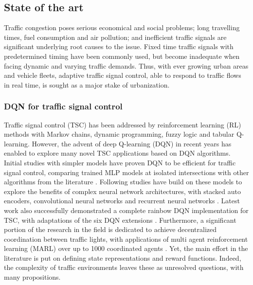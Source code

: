 \documentclass[journal]{IEEEtran}
\begin{document}
\subsection{State of the art}

Traffic congestion poses serious economical and social problems; long travelling times, fuel consumption and air pollution; and inefficient traffic signals are significant underlying root causes to the issue. Fixed time traffic signals with predetermined timing have been commonly used, but become inadequate when facing dynamic and varying traffic demands. Thus, with ever growing urban areas and vehicle fleets, adaptive traffic signal control, able to respond to traffic flows in real time, is sought as a major stake of urbanization. \\

\subsubsection{DQN for traffic signal control}

Traffic signal control (TSC) has been addressed by reinforcement learning (RL) methods with Markov chains, dynamic programming, fuzzy logic \cite{alam2015design} and tabular Q-learning. However, the advent of deep Q-learning (DQN) in recent years has enabled to explore many novel TSC applications based on DQN algorithms. Initial studies with simpler models have proven DQN to be efficient for traffic signal control, comparing trained MLP models at isolated intersections with other algorithms from the literature \cite{stevens2016reinforcement,genders2019opensource}. Following studies have build on these models to explore the benefits of complex neural network architectures, with stacked auto encoders, convolutional neural networks and recurrent neural networks \cite{li2016traffic,gao2017adaptative,liang2019deep,wei2018intellilight,vidali2019deep}. Latest work also successfully demonstrated a complete rainbow DQN implementation for TSC, with adaptations of the six DQN extensions \cite{alemzadeh2020adaptative}. Furthermore, a significant portion of the research in the field is dedicated to achieve decentralized coordination between traffic lights, with applications of multi agent reinforcement learning (MARL) over up to 1000 coordinated agents \cite{pol2016coordinated,wei2019presslight,wei2019colight,chen2020toward}. Yet, the main effort in the literature is put on defining state representations and reward functions. Indeed, the complexity of traffic environments leaves these as unresolved questions, with many propositions. \\
\end{document}
